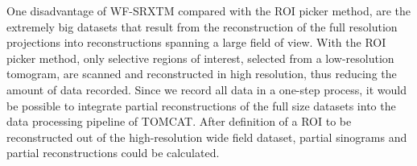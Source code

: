 One disadvantage of WF-SRXTM compared with the ROI picker method, are the extremely big datasets that result from the reconstruction of the full resolution projections into reconstructions spanning a large field of view. With the ROI picker method, only selective regions of interest, selected from a low-resolution tomogram, are scanned and reconstructed in high resolution, thus reducing the amount of data recorded. Since we record all data in a one-step process, it would be possible to integrate partial reconstructions of the full size datasets into the data processing pipeline of TOMCAT. After definition of a ROI to be reconstructed out of the high-resolution wide field dataset, partial sinograms and partial reconstructions could be calculated.